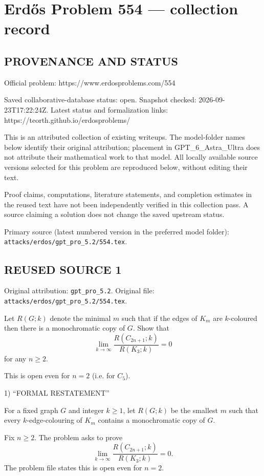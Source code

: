 \section*{Erd\H{o}s Problem 554 --- collection record}

\subsection*{PROVENANCE AND STATUS}
Official problem: https://www.erdosproblems.com/554

Saved collaborative-database status: open.
Snapshot checked: 2026-09-23T17:22:24Z.
Latest status and formalization links: https://teorth.github.io/erdosproblems/

This is an attributed collection of existing writeups. The model-folder names below identify their original attribution; placement in GPT\_6\_Astra\_Ultra does not attribute their mathematical work to that model. All locally available source versions selected for this problem are reproduced below, without editing their text.

Proof claims, computations, literature statements, and completion estimates in the reused text have not been independently verified in this collection pass. A source claiming a solution does not change the saved upstream status.

Primary source (latest numbered version in the preferred model folder): \texttt{attacks/erdos/gpt\_pro\_5.2/554.tex}.

\subsection*{REUSED SOURCE 1}
Original attribution: \texttt{gpt\_pro\_5.2}.
Original file: \texttt{attacks/erdos/gpt\_pro\_5.2/554.tex}.


Let $R(G;k)$ denote the minimal $m$ such that if the edges of $K_m$ are $k$-coloured then there is a monochromatic copy of $G$. Show that 
\[
\lim_{k\to \infty} \frac{R(C_{2n+1};k)}{R(K_3;k)} =0
\]
for any $n\ge 2$.

This is open even for $n=2$ (i.e. for $C_5$).

1) “FORMAL RESTATEMENT”

For a fixed graph $G$ and integer $k\ge 1$, let $R(G;k)$ be the smallest $m$ such that every $k$-edge-colouring of $K_m$ contains a monochromatic copy of $G$.

Fix $n\ge 2$. The problem asks to prove
\[
\lim_{k\to\infty} \frac{R(C_{2n+1};k)}{R(K_3;k)} = 0.
\]
The problem file states this is open even for $n=2$.

